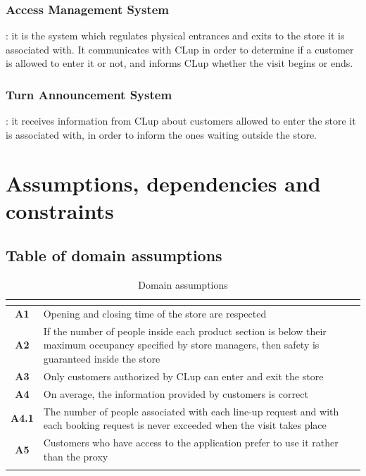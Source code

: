 \documentclass[a4paper,oneside,11pt]{book}   %
\begin{document}
    \subsubsection{Access Management System}: it is the system which regulates physical entrances and exits to the store it is associated with. It communicates with CLup in order to determine if a customer is allowed to enter it or not, and informs CLup whether the visit begins or ends.
    \subsubsection{Turn Announcement System}: it receives information from CLup about customers allowed to enter the store it is associated with, in order to inform the ones waiting outside the store.
    
    \section{Assumptions, dependencies and constraints}
    \subsection{Table of domain assumptions}
    \begin{longtable}[c]{|>{\bfseries{}}c|V{.62\textwidth}|}
        \hline
         \\
        \hline
        A1   & Opening and closing time of the store are respected \\ \hline
        A2   & If the number of people inside each product section is below their maximum occupancy specified by store managers, then safety is guaranteed inside the store \\ \hline
        A3   & Only customers authorized by CLup can enter and exit the store \\ \hline
        A4   & On average, the information provided by customers is correct \\ \hline
        A4.1 & The number of people associated with each line-up request and with each booking request is never exceeded when the visit takes place \\ \hline
        A5   & Customers who have access to the application prefer to use it rather than the proxy \\
        \hline
        \caption{Domain assumptions}
        \label{table:domain_assumptions}
    \end{longtable}
    
\end{document}
